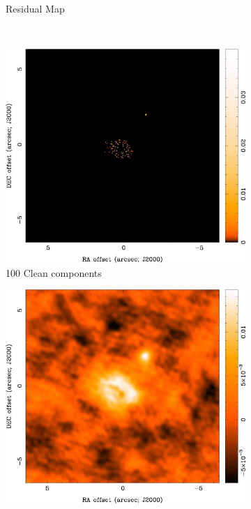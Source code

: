 \begin{figure}
\begin{subfigure}[b]{0.5\textwidth}
                \caption{Residual Map}
                \label{fig:ResMap1}
        \end{subfigure} %
        ~ %
        \begin{subfigure}[b]{0.5\textwidth}
		\centering                
                \includegraphics[scale=0.6]{Figures/uv-coverage/cleanD100map}
                \caption{100 Clean components}
                \label{fig:clmap100}
        \end{subfigure}%
          \begin{subfigure}[b]{0.5\textwidth}
				\centering                
                \includegraphics[scale=0.6]{Figures/uv-coverage/cleanD100res}

\end{subfigure}
\end{figure}
